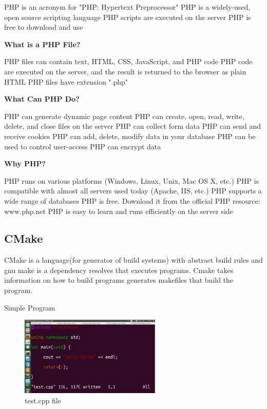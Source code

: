     PHP is an acronym for "PHP: Hypertext Preprocessor"
    PHP is a widely-used, open source scripting language
    PHP scripts are executed on the server
    PHP is free to download and use

 {\bf What is a PHP File?}

    PHP files can contain text, HTML, CSS, JavaScript, and PHP code
    PHP code are executed on the server, and the result is returned to the browser as plain HTML
    PHP files have extension ".php"

 {\bf What Can PHP Do?}

    PHP can generate dynamic page content
    PHP can create, open, read, write, delete, and close files on the server
    PHP can collect form data
    PHP can send and receive cookies
    PHP can add, delete, modify data in your database
    PHP can be used to control user-access
    PHP can encrypt data

  {\bf Why PHP?}

    PHP runs on various platforms (Windows, Linux, Unix, Mac OS X, etc.)
    PHP is compatible with almost all servers used today (Apache, IIS, etc.)
    PHP supports a wide range of databases
    PHP is free. Download it from the official PHP resource: www.php.net
    PHP is easy to learn and runs efficiently on the server side
\fi
\subsection{CMake}

CMake is a language(for generator of build systems) with abstract build rules and gnu make is a dependency resolves that executes programs. Cmake takes information on how to build programs generates makefiles that build the program. 

Simple Program 

\begin{figure}[!ht]
\centering
\includegraphics[width=0.6\textwidth]{input/images/cgs/hello.png}                   
\caption{test.cpp file}
\hspace{-1.5em}
\end{figure}

